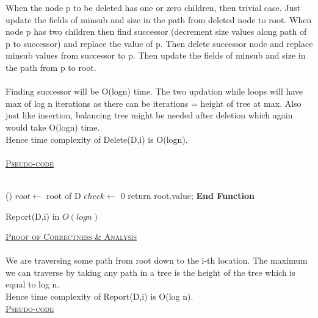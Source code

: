 \documentclass[a4 paper]{article}
\begin{document}
When the node p to be deleted has one or zero children, then trivial case. Just update the fields of minsub and size in the path from deleted node to root. When node p has two children then find successor (decrement size values along path of p to successor) and replace the value of p. Then delete successor node and replace minsub values from successor to p. Then update the fields of minsub and size in the path from p to root.\\\\ Finding successor will be O(logn) time. The two updation while loops will have max of log n iterations as there can be iterations = height of tree at max. Also just like insertion, balancing tree might be needed after deletion which again would take O(logn) time.\\ Hence time complexity of Delete(D,i) is O(logn).\\\\
\underline{\textsc{Pseudo-code}}\\\\
\begin{algorithm}[H]
\SetAlgoLined
{}
%
\Fn(){\FRecurs}
{
$root \leftarrow $ {root of D}\;
$check \leftarrow $ 0\; 
return root.value;
}
\textbf{End Function}
\caption{Report(D,i) in $O(logn)$}
\end{algorithm}
\vspace{4mm}
\underline{\textsc{Proof of Correctness \& Analysis}}\\\\
We are traversing some path from root down to the i-th location. The maximum we can traverse by taking any path in a tree is the height of the tree which is equal to log n.\\ Hence time complexity of Report(D,i) is O(log n).\\
\newpage
{}
\underline{\textsc{Pseudo-code}}\\\\
\end{document}
